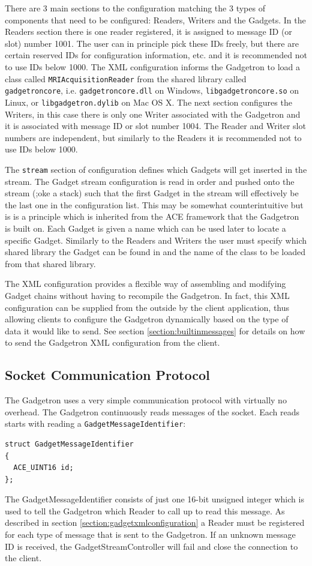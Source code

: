 \documentclass[11pt]{article}
\begin{document}
There are 3 main sections to the configuration matching the 3 types of components that need to be configured: Readers, Writers and the Gadgets. In the Readers section there is one reader registered, it is assigned to message ID (or slot) number 1001. The user can in principle pick these IDs freely, but there are certain reserved IDs for configuration information, etc. and it is recommended not to use IDs below 1000. The XML configuration informs the Gadgetron to load a class called \texttt{MRIAcquisitionReader} from the shared library called \texttt{gadgetroncore}, i.e. \texttt{gadgetroncore.dll} on Windows, \texttt{libgadgetroncore.so} on Linux, or \texttt{libgadgetron.dylib} on Mac OS X. The next section configures the Writers, in this case there is only one Writer associated with the Gadgetron and it is associated with message ID or slot number 1004. The Reader and Writer slot numbers are independent, but similarly to the Readers it is recommended not to use IDs below 1000.

The \texttt{stream} section of configuration defines which Gadgets will get inserted in the stream. The Gadget stream configuration is read in order and pushed onto the stream (;oke a stack) such that the first Gadget in the stream will effectively be the last one in the configuration list. This may be somewhat counterintuitive but is is a principle which is inherited from the ACE framework that the Gadgetron is built on. Each Gadget is given a name which can be used later to locate a specific Gadget. Similarly to the Readers and Writers the user must specify which shared library the Gadget can be found in and the name of the class to be loaded from that shared library. 

The XML configuration provides a flexible way of assembling and modifying Gadget chains without having to recompile the Gadgetron. In fact, this XML configuration can be supplied from the outside by the client application, thus allowing clients to configure the Gadgetron dynamically based on the type of data it would like to send. See section \ref{section:builtinmessages} for details on how to send the Gadgetron XML configuration from the client. 

\subsection{Socket Communication Protocol}
\label{section:socketcommunicationprotocol}
The Gadgetron uses a very simple communication protocol with virtually no overhead. The Gadgetron continuously reads messages of the socket. Each reads starts with reading a \texttt{GadgetMessageIdentifier}:
{\scriptsize 
\begin{verbatim}
struct GadgetMessageIdentifier
{
  ACE_UINT16 id;
};
\end{verbatim}}
The  GadgetMessageIdentifier consists of just one 16-bit unsigned integer which is used to tell the Gadgetron which Reader to call up to read this message. As described in section \ref{section:gadgetxmlconfiguration} a Reader must be registered for each type of message that is sent to the Gadgetron. If an unknown message ID is received, the GadgetStreamController will fail and close the connection to the client. 
\end{document}
